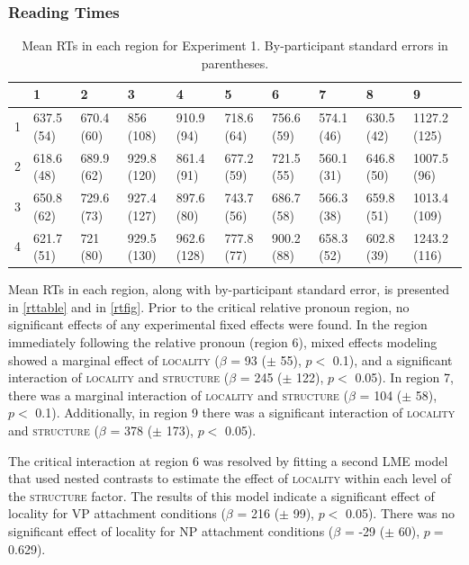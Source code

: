 \documentclass[12pt]{article}
\begin{document}
\subsubsection{Reading Times}
\label{sec:rts}

\begin{table}[ht]
\centering
{\scriptsize
\begin{tabularx}{\textwidth}{rlllllllll}
  \hline
 & 1 & 2 & 3 & 4 & 5 & 6 & 7 & 8 & 9 \\ 
  \hline
1 & 637.5 (54) & 670.4 (60) & 856 (108) & 910.9 (94) & 718.6 (64) & 756.6 (59) & 574.1 (46) & 630.5 (42) & 1127.2 (125) \\ 
  2 & 618.6 (48) & 689.9 (62) & 929.8 (120) & 861.4 (91) & 677.2 (59) & 721.5 (55) & 560.1 (31) & 646.8 (50) & 1007.5 (96) \\ 
  3 & 650.8 (62) & 729.6 (73) & 927.4 (127) & 897.6 (80) & 743.7 (56) & 686.7 (58) & 566.3 (38) & 659.8 (51) & 1013.4 (109) \\ 
  4 & 621.7 (51) & 721 (80) & 929.5 (130) & 962.6 (128) & 777.8 (77) & 900.2 (88) & 658.3 (52) & 602.8 (39) & 1243.2 (116) \\ 
   \hline
\end{tabularx}
}
\caption{Mean RTs in each region for Experiment 1. By-participant standard errors in parentheses.} 
\end{table}
Mean RTs in each region, along with by-participant standard error, is presented in \ref{rttable} and in \ref{rtfig}. Prior to the critical relative pronoun region, no significant effects of any experimental fixed effects were found. In the region immediately following the relative pronoun (region 6), mixed effects modeling showed a marginal effect of \textsc{locality} ($\beta$ = 93 ($\pm$ 55), $p <$ 0.1), and a significant interaction of \textsc{locality} and \textsc{structure} ($\beta$ = 245 ($\pm$ 122), $p <$ 0.05). In region 7, there was a marginal interaction of \textsc{locality} and \textsc{structure} ($\beta$ = 104 ($\pm$ 58), $p <$ 0.1). Additionally, in region 9 there was a significant interaction of \textsc{locality} and \textsc{structure} ($\beta$ = 378 ($\pm$ 173), $p <$ 0.05).

The critical interaction at region 6 was resolved by fitting a second LME model that used nested contrasts to estimate the effect of \textsc{locality} within each level of the \textsc{structure} factor. The results of this model indicate a significant effect of locality for VP attachment conditions ($\beta$ = 216 ($\pm$ 99), $p <$ 0.05). There was no significant effect of locality for NP attachment conditions ($\beta$ = -29 ($\pm$ 60), $p =$ 0.629).
\end{document}
